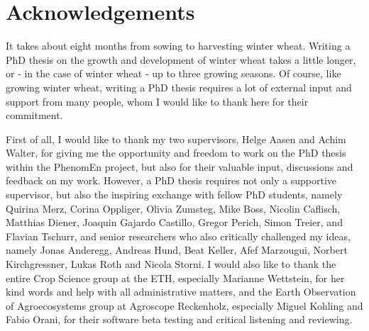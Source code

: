 \chapter*{Acknowledgements}
\renewcommand{\sectionmark}[1]{ \markright{ \MakeUppercase{#1} } }

It takes about eight months from sowing to harvesting winter wheat. Writing a PhD thesis on the growth and development of winter wheat takes a little longer, or - in the case of winter wheat - up to three growing seasons. Of course, like growing winter wheat, writing a PhD thesis requires a lot of external input and support from many people, whom I would like to thank here for their commitment.

First of all, I would like to thank my two supervisors, Helge Aasen and Achim Walter, for giving me the opportunity and freedom to work on the PhD thesis within the PhenomEn project, but also for their valuable input, discussions and feedback on my work. However, a PhD thesis requires not only a supportive supervisor, but also the inspiring exchange with fellow PhD students, namely Quirina Merz, Corina Oppliger, Olivia Zumsteg, Mike Boss, Nicolin Caflisch, Matthias Diener, Joaquin Gajardo Castillo, Gregor Perich, Simon Treier, and Flavian Tschurr, and senior researchers who also critically challenged my ideas, namely Jonas Anderegg, Andreas Hund, Beat Keller, Afef Marzougui, Norbert Kirchgressner, Lukas Roth and Nicola Storni. I would also like to thank the entire Crop Science group at the ETH, especially Marianne Wettstein, for her kind words and help with all administrative matters, and the Earth Observation of Agroecosystems group at Agroscope Reckenholz, especially Miguel Kohling and Fabio Orani, for their software beta testing and critical listening and reviewing.

